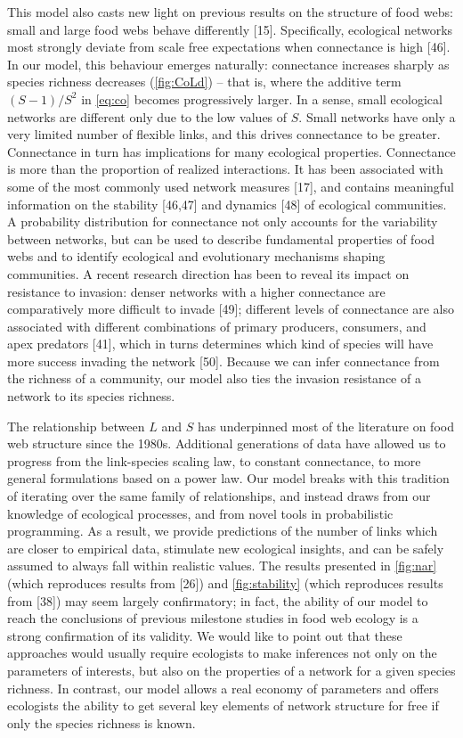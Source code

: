 \documentclass[12pt]{article}
\begin{document}
This model also casts new light on previous results on the structure of
food webs: small and large food webs behave differently {[}15{]}.
Specifically, ecological networks most strongly deviate from scale free
expectations when connectance is high {[}46{]}. In our model, this
behaviour emerges naturally: connectance increases sharply as species
richness decreases (\cref{fig:CoLd}) -- that is, where the additive term
\((S-1)/S^{2}\) in \cref{eq:co} becomes progressively larger. In a
sense, small ecological networks are different only due to the low
values of \(S\). Small networks have only a very limited number of
flexible links, and this drives connectance to be greater. Connectance
in turn has implications for many ecological properties. Connectance is
more than the proportion of realized interactions. It has been
associated with some of the most commonly used network measures
{[}17{]}, and contains meaningful information on the stability
{[}46,47{]} and dynamics {[}48{]} of ecological communities. A
probability distribution for connectance not only accounts for the
variability between networks, but can be used to describe fundamental
properties of food webs and to identify ecological and evolutionary
mechanisms shaping communities. A recent research direction has been to
reveal its impact on resistance to invasion: denser networks with a
higher connectance are comparatively more difficult to invade {[}49{]};
different levels of connectance are also associated with different
combinations of primary producers, consumers, and apex predators
{[}41{]}, which in turns determines which kind of species will have more
success invading the network {[}50{]}. Because we can infer connectance
from the richness of a community, our model also ties the invasion
resistance of a network to its species richness.

The relationship between \(L\) and \(S\) has underpinned most of the
literature on food web structure since the 1980s. Additional generations
of data have allowed us to progress from the link-species scaling law,
to constant connectance, to more general formulations based on a power
law. Our model breaks with this tradition of iterating over the same
family of relationships, and instead draws from our knowledge of
ecological processes, and from novel tools in probabilistic programming.
As a result, we provide predictions of the number of links which are
closer to empirical data, stimulate new ecological insights, and can be
safely assumed to always fall within realistic values. The results
presented in \cref{fig:nar} (which reproduces results from {[}26{]}) and
\cref{fig:stability} (which reproduces results from {[}38{]}) may seem
largely confirmatory; in fact, the ability of our model to reach the
conclusions of previous milestone studies in food web ecology is a
strong confirmation of its validity. We would like to point out that
these approaches would usually require ecologists to make inferences not
only on the parameters of interests, but also on the properties of a
network for a given species richness. In contrast, our model allows a
real economy of parameters and offers ecologists the ability to get
several key elements of network structure for free if only the species
richness is known.
\end{document}
